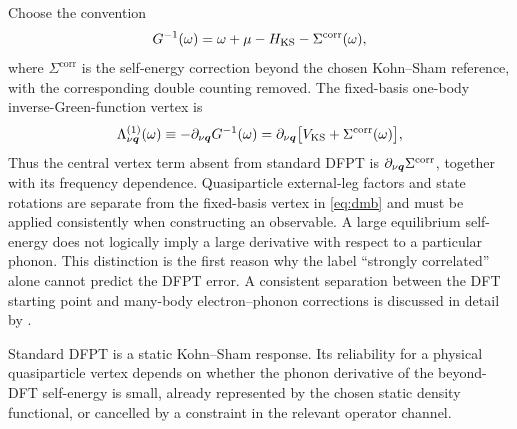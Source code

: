 Choose the convention
\begin{equation}
  G^{-1}(\omega)=
  \omega+\mu-H_{\mathrm{KS}}-\Sigma^{\mathrm{corr}}(\omega),
  \label{eq:gconvention}
\end{equation}
where $\Sigma^{\mathrm{corr}}$ is the self-energy correction beyond the chosen
Kohn--Sham reference, with the corresponding double counting removed.  The
fixed-basis one-body inverse-Green-function vertex is
\begin{equation}
  \Lambda^{(1)}_{\nu\bm{q}}(\omega)
  \equiv-\partial_{\nu\bm{q}}G^{-1}(\omega)
  = \partial_{\nu\bm{q}}
    \bigl[V_{\mathrm{KS}}+\Sigma^{\mathrm{corr}}(\omega)\bigr],
  \label{eq:dmb}
\end{equation}
Thus the central vertex term absent from standard DFPT is
$\partial_{\nu\bm{q}}\Sigma^{\mathrm{corr}}$, together with its frequency
dependence.  Quasiparticle external-leg factors and state rotations are separate
from the fixed-basis vertex in \cref{eq:dmb} and must be applied consistently
when constructing an observable.  A large equilibrium
self-energy does not logically imply a large derivative with respect to a
particular phonon.  This distinction is the first reason why the label ``strongly
correlated'' alone cannot predict the DFPT error.  A consistent separation between
the DFT starting point and many-body electron--phonon corrections is discussed in
detail by \citet{Marini2015}.

\begin{keypoint}
Standard DFPT is a static Kohn--Sham response.  Its reliability for a physical
quasiparticle vertex depends on whether the phonon derivative of the beyond-DFT
self-energy is small, already represented by the chosen static density
functional, or cancelled by a constraint in the relevant operator channel.
\end{keypoint}
